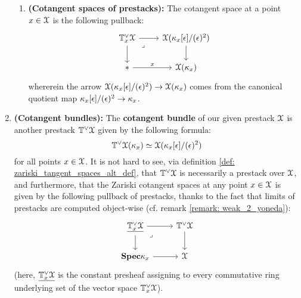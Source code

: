 \begin{definition}
\begin{enumerate}
\begin{enumerate}
                                \item \textbf{(Cotangent spaces of prestacks):} The cotangent space at a point $x \in \mathcal{X}$ is the following pullback:
                                    $$
                                        \begin{tikzcd}
                                        	{\T^{\vee}_x\calX} & {\calX(\kappa_x[\e]/(\e)^2)} \\
                                        	{*} & {\calX(\kappa_x)}
                                        	\arrow["x", from=2-1, to=2-2]
                                        	\arrow[from=1-1, to=2-1]
                                        	\arrow[from=1-1, to=1-2]
                                        	\arrow[from=1-2, to=2-2]
                                        	\arrow["\lrcorner"{anchor=center, pos=0.125}, draw=none, from=1-1, to=2-2]
                                        \end{tikzcd}
                                    $$
                                whererein the arrow $\mathcal{X}(\kappa_x[\epsilon]/(\epsilon)^2) \to \mathcal{X}(\kappa_x)$ comes from the canonical quotient map $\kappa_x[\epsilon]/(\epsilon)^2 \to \kappa_x$.
                            \end{enumerate}
                        \item \textbf{(Cotangent bundles):} The \textbf{cotangent bundle} of our given prestack $\mathcal{X}$ is another prestack $\mathbb{T}^{\vee}\mathcal{X}$ given by the following formula:
                            $$\mathbb{T}^{\vee}\mathcal{X}(\kappa_x) \simeq \mathcal{X}(\kappa_x[\epsilon]/(\epsilon)^2)$$
                        for all points $x \in \mathcal{X}$. It is not hard to see, via definition \ref{def: zariski_tangent_spaces_alt_def}, that $\mathbb{T}^{\vee}\mathcal{X}$ is necessarily a prestack over $\mathcal{X}$, and furthermore, that the Zariski cotangent spaces at any point $x \in \mathcal{X}$ is given by the following pullback of prestacks, thanks to the fact that limits of prestacks are computed object-wise (cf. remark \ref{remark: weak_2_yoneda}):
                            $$
                                \begin{tikzcd}
                                	{\underline{\T^{\vee}_x\calX}} & {\T^{\vee}\calX} \\
                                	{\Spec \kappa_x} & \calX
                                	\arrow[from=1-2, to=2-2]
                                	\arrow[from=2-1, to=2-2]
                                	\arrow[from=1-1, to=1-2]
                                	\arrow[from=1-1, to=2-1]
                                	\arrow["\lrcorner"{anchor=center, pos=0.125}, draw=none, from=1-1, to=2-2]
                                \end{tikzcd}
                            $$
                        (here, $\underline{\mathbb{T}^{\vee}_x\mathcal{X}}$ is the constant presheaf assigning to every commutative ring underlying set of the vector space $\mathbb{T}^{\vee}_x\mathcal{X}$).
                    \end{enumerate}
            \end{definition}
